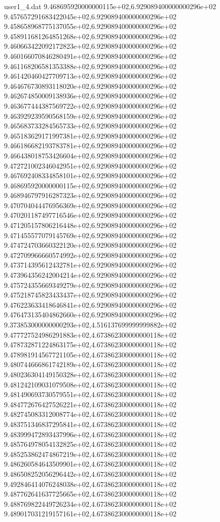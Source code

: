 \begin{filecontents}{user1_4.dat}
9.468695920000000115e+02,6.929089400000000296e+02
9.457657291683422045e+02,6.929089400000000296e+02
9.458658968775137055e+02,6.929089400000000296e+02
9.458911681264851268e+02,6.929089400000000296e+02
9.460663422092172823e+02,6.929089400000000296e+02
9.460166070846280491e+02,6.929089400000000296e+02
9.461168206581353388e+02,6.929089400000000296e+02
9.461420460427709713e+02,6.929089400000000296e+02
9.464676730893118020e+02,6.929089400000000296e+02
9.462674850009138936e+02,6.929089400000000296e+02
9.463677444387569722e+02,6.929089400000000296e+02
9.463929239590568159e+02,6.929089400000000296e+02
9.465683733284565733e+02,6.929089400000000296e+02
9.465183629171997381e+02,6.929089400000000296e+02
9.466186682193783781e+02,6.929089400000000296e+02
9.466438018753426604e+02,6.929089400000000296e+02
9.472721002346042951e+02,6.929089400000000296e+02
9.467692408334858101e+02,6.929089400000000296e+02
9.468695920000000115e+02,6.929089400000000296e+02
9.468946797916287323e+02,6.929089400000000296e+02
9.470704044476956369e+02,6.929089400000000296e+02
9.470201187497716546e+02,6.929089400000000296e+02
9.471205157806216448e+02,6.929089400000000296e+02
9.471455577079145769e+02,6.929089400000000296e+02
9.474724703660322120e+02,6.929089400000000296e+02
9.472709966660574992e+02,6.929089400000000296e+02
9.473714395612432781e+02,6.929089400000000296e+02
9.473964356242004214e+02,6.929089400000000296e+02
9.475724355669349279e+02,6.929089400000000296e+02
9.475218745823433437e+02,6.929089400000000296e+02
9.476223633418646841e+02,6.929089400000000296e+02
9.476473135404862660e+02,6.929089400000000296e+02
9.373853000000000293e+02,4.516137699999999882e+02
9.477727524986291883e+02,4.673862300000000118e+02
9.478732871224863175e+02,4.673862300000000118e+02
9.478981914567721105e+02,4.673862300000000118e+02
9.480744666861742189e+02,4.673862300000000118e+02
9.480236304149150328e+02,4.673862300000000118e+02
9.481242109031079508e+02,4.673862300000000118e+02
9.481490693730579551e+02,4.673862300000000118e+02
9.484772676427526221e+02,4.673862300000000118e+02
9.482745083312008774e+02,4.673862300000000118e+02
9.483751346837295841e+02,4.673862300000000118e+02
9.483999472893437996e+02,4.673862300000000118e+02
9.485764978054132825e+02,4.673862300000000118e+02
9.485253862474867219e+02,4.673862300000000118e+02
9.486260584643509901e+02,4.673862300000000118e+02
9.486508252056296442e+02,4.673862300000000118e+02
9.492846414076248038e+02,4.673862300000000118e+02
9.487762641637725665e+02,4.673862300000000118e+02
9.488769822449726234e+02,4.673862300000000118e+02
9.489017031219157161e+02,4.673862300000000118e+02

\end{filecontents}
